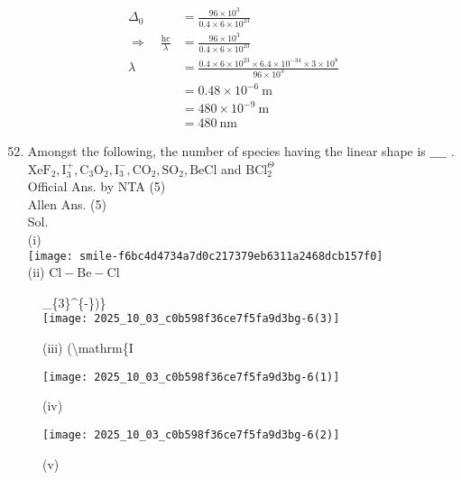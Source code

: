 \documentclass[10pt]{article}
\begin{document}
\[
\begin{aligned}
\Delta_{0} & =\frac{96 \times 10^{3}}{0.4 \times 6 \times 10^{23}} \\
\Rightarrow \quad \frac{\mathrm{hc}}{\lambda} & =\frac{96 \times 10^{3}}{0.4 \times 6 \times 10^{23}} \\
\lambda & =\frac{0.4 \times 6 \times 10^{23} \times 6.4 \times 10^{-34} \times 3 \times 10^{8}}{96 \times 10^{3}} \\
& =0.48 \times 10^{-6} \mathrm{~m} \\
& =480 \times 10^{-9} \mathrm{~m} \\
& =480 \mathrm{~nm}
\end{aligned}
\]

\begin{enumerate}
  \setcounter{enumi}{51}
  \item Amongst the following, the number of species having the linear shape is \(\_\_\_\_\) .\\
\(\mathrm{XeF}_{2}, \mathrm{I}_{3}^{+}, \mathrm{C}_{3} \mathrm{O}_{2}, \mathrm{I}_{3}^{-}, \mathrm{CO}_{2}, \mathrm{SO}_{2}, \mathrm{BeCl}\) and \(\mathrm{BCl}_{2}^{\Theta}\)\\
Official Ans. by NTA (5)\\
Allen Ans. (5)\\
Sol.\\
(i)\\
\texttt{[image: smile-f6bc4d4734a7d0c217379eb6311a2468dcb157f0]}\\
(ii) \(\mathrm{Cl}-\mathrm{Be}-\mathrm{Cl}\)
\end{enumerate}

\begin{figure}[h]
\begin{center}
\captionsetup{labelformat=empty}
\caption{(iii) (\textbackslash mathrm\{I}\_\{3\}\^{}\{-\})\}\\
  \texttt{[image: 2025\_10\_03\_c0b598f36ce7f5fa9d3bg-6(3)]}
\end{center}
\end{figure}

\begin{figure}[h]
\begin{center}
\captionsetup{labelformat=empty}
\caption{(iv)}
  \texttt{[image: 2025\_10\_03\_c0b598f36ce7f5fa9d3bg-6(1)]}
\end{center}
\end{figure}

\begin{figure}[h]
\begin{center}
\captionsetup{labelformat=empty}
\caption{(v)}
  \texttt{[image: 2025\_10\_03\_c0b598f36ce7f5fa9d3bg-6(2)]}
\end{center}
\end{figure}
\end{document}
